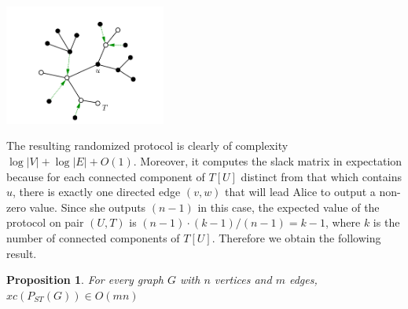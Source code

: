 \documentclass{article}
\newtheorem*{proposition}{Proposition}
\begin{document}
\includegraphics[width=200px]{spanning-tree.png}

The resulting randomized protocol is clearly of complexity $\log |V| + \log |E|
+ O(1)$. Moreover, it computes the slack matrix in expectation because for each
connected component of $T[U]$ distinct from that which contains $u$, there is
exactly one directed edge $(v, w)$ that will lead Alice to output a non-zero
value. Since she outputs $(n - 1)$ in this case, the expected value of the
protocol on pair $(U, T)$ is $(n - 1) \cdot (k - 1)/(n-1) = k - 1$, where $k$
is the number of connected components of $T[U]$. Therefore we obtain the
following result.

\begin{proposition}
	For every graph $G$ with $n$ vertices and $m$ edges, $xc(P_{ST}(G)) \in
	O(mn)$
\end{proposition}
\end{document}
